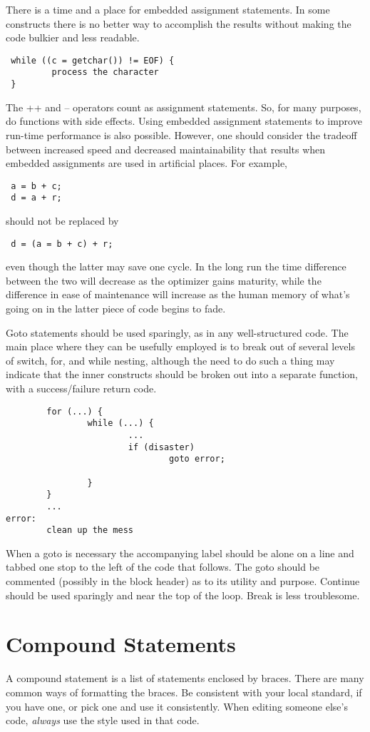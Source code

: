  There is a time and a place for embedded assignment statements. In some
constructs there is no better way to accomplish the results without making the
code bulkier and less readable.

\begin{verbatim}
 while ((c = getchar()) != EOF) {
         process the character
 }
\end{verbatim}

The ++ and -- operators count as assignment statements. So, for many purposes,
do functions with side effects. Using embedded assignment statements to
improve run-time performance is also possible. However, one should consider
the tradeoff between increased speed and decreased maintainability that results
when embedded assignments are used in artificial places. For example, 
\begin{verbatim}
 a = b + c;
 d = a + r; 
\end{verbatim}
should not be replaced by 
\begin{verbatim}
 d = (a = b + c) + r; 
\end{verbatim}
even though the latter may save one cycle. In the long run the time difference
between the two will decrease as the optimizer gains maturity, while the
difference in ease of maintenance will increase as the human memory of what's
going on in the latter piece of code begins to fade. 

 Goto statements should be used sparingly, as in any well-structured code. The
main place where they can be usefully employed is to break out of several
levels of switch, for, and while nesting, although the need to do such a thing
may indicate that the inner constructs should be broken out into a separate
function, with a success/failure return code. 

\begin{verbatim}
        for (...) {
                while (...) {
                        ...
                        if (disaster)
                                goto error; 

                }
        }
        ...
error:
        clean up the mess 
\end{verbatim}

When a goto is necessary the accompanying label should be alone on a line and
tabbed one stop to the left of the code that follows. The goto should be
commented (possibly in the block header) as to its utility and purpose.
Continue should be used sparingly and near the top of the loop. Break is less
troublesome. 
\newpage
\section{Compound Statements}
 A compound statement is a list of statements enclosed by braces. There are
many common ways of formatting the braces. Be consistent with your local
standard, if you have one, or pick one and use it consistently. When editing
someone else's code, {\em always} use the style used in that code. 

